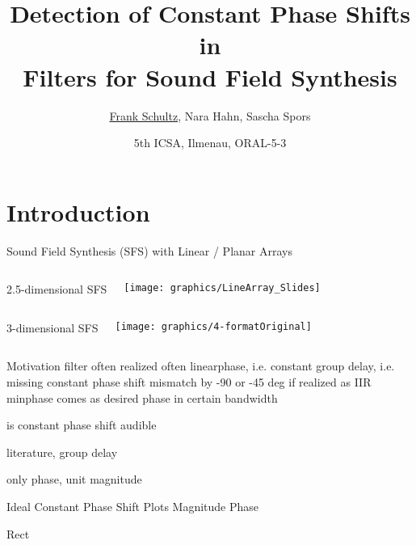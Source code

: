 \documentclass[mathserif]{intbeamer}
\title[Audibility Constant Phase Shifts]%
  {Detection of Constant Phase Shifts in\\Filters for Sound Field Synthesis}
\author[Schultz, Hahn, Spors]{%
    \underline{Frank Schultz},
    Nara Hahn,
    Sascha Spors
}
\date[2019-09-28]{%
  5th ICSA, Ilmenau, ORAL-5-3\\
}
\institute[]{Institute of Communications Engineering, University of Rostock}
\begin{document}
\maketitle
%
%
%
\section{Introduction}
\begin{frame}{Sound Field Synthesis (SFS) with Linear / Planar Arrays}

\begin{columns}[T]
2.5-dimensional SFS

\hspace{1cm}\texttt{[image: graphics/LineArray\_Slides]}
\end{columns}
\vspace{0.5cm}
\begin{columns}[T]
3-dimensional SFS

\texttt{[image: graphics/4-formatOriginal]}
\end{columns}
\end{frame}
%
%
%
\begin{frame}{Motivation}
filter often realized often linearphase, i.e. constant group delay,
i.e. missing constant phase shift mismatch by -90 or -45 deg
if realized as IIR minphase comes as desired phase in certain bandwidth

is constant phase shift audible

literature, group delay

only phase, unit magnitude

\end{frame}
%
%
%
\begin{frame}{Ideal Constant Phase Shift}
Plots
Magnitude Phase

Rect
\end{frame}
%
%
%
\end{document}
